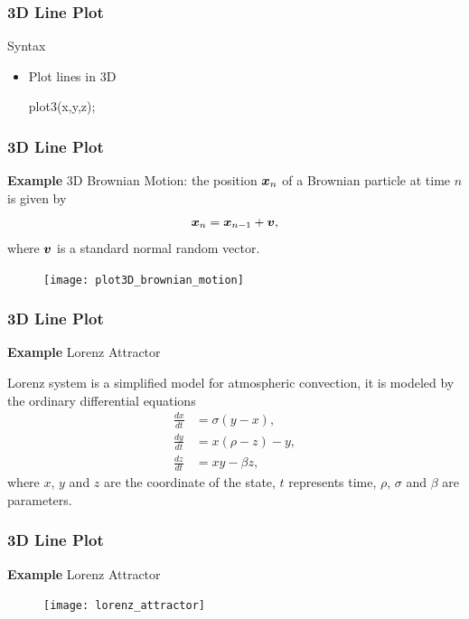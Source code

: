 \documentclass{beamer}  %
\begin{document}
\begin{frame}[fragile]
\frametitle{3D Line Plot}
\begin{block}{Syntax}
\begin{itemize}
    \item Plot lines in 3D
          \begin{matlabcodebeamer}[numbers=none,frame=none]
          plot3(x,y,z);
          \end{matlabcodebeamer}
\end{itemize}
\end{block}

\end{frame}
\begin{frame}[fragile]
\frametitle{3D Line Plot}
\textbf{Example} 3D Brownian Motion:
the position $\boldsymbol{x}_n$ of a Brownian particle at time $n$ is given by
\begin{equation}
    \boldsymbol{x}_n = \boldsymbol{x}_{n-1} + \boldsymbol{v},
\end{equation}
where $\boldsymbol{v}$ is a standard normal random vector.

\setcounter{subfigure}{0}
\begin{figure}
    \centering
   \texttt{[image: plot3D\_brownian\_motion]}
\end{figure}

\end{frame}
\begin{frame}[fragile]
\frametitle{3D Line Plot}
\textbf{Example} Lorenz Attractor

Lorenz system is a simplified model for atmospheric convection, it is modeled by the ordinary differential equations
 \begin{align}
\frac{dx}{dt} &= \sigma (y - x), \\
\frac{dy}{dt} &= x (\rho - z) - y, \\
\frac{dz}{dt} &= x y - \beta z,
\end{align} 
where $x$, $y$ and $z$ are the coordinate of the state, $t$ represents time, $\rho$, $\sigma$ and $\beta$ are parameters.


\end{frame}
\begin{frame}[fragile]
\frametitle{3D Line Plot}
\textbf{Example} Lorenz Attractor

\setcounter{subfigure}{0}
\begin{figure}
    \centering
   \texttt{[image: lorenz\_attractor]}
\end{figure}

\end{frame}
\end{document}
